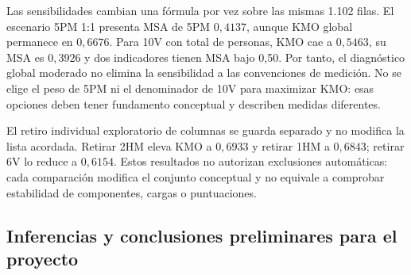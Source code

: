 Las sensibilidades cambian una fórmula por vez sobre las mismas 1.102 filas. El escenario 5PM 1:1 presenta MSA de 5PM $0,4137$, aunque KMO global permanece en $0,6676$. Para 10V con total de personas, KMO cae a $0,5463$, su MSA es $0,3926$ y dos indicadores tienen MSA bajo 0,50. Por tanto, el diagnóstico global moderado no elimina la sensibilidad a las convenciones de medición. No se elige el peso de 5PM ni el denominador de 10V para maximizar KMO: esas opciones deben tener fundamento conceptual y describen medidas diferentes.

El retiro individual exploratorio de columnas se guarda separado y no modifica la lista acordada. Retirar 2HM eleva KMO a $0,6933$ y retirar 1HM a $0,6843$; retirar 6V lo reduce a $0,6154$. Estos resultados no autorizan exclusiones automáticas: cada comparación modifica el conjunto conceptual y no equivale a comprobar estabilidad de componentes, cargas o puntuaciones.

\subsection{Inferencias y conclusiones preliminares para el proyecto}

